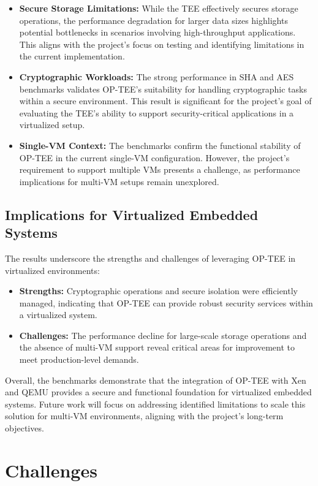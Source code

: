 \documentclass[acmtog]{acmart}
\begin{document}
\begin{itemize}
    \item \textbf{Secure Storage Limitations:} While the TEE effectively secures storage operations, the performance degradation for larger data sizes highlights potential bottlenecks in scenarios involving high-throughput applications. This aligns with the project's focus on testing and identifying limitations in the current implementation.
    \item \textbf{Cryptographic Workloads:} The strong performance in SHA and AES benchmarks validates OP-TEE's suitability for handling cryptographic tasks within a secure environment. This result is significant for the project's goal of evaluating the TEE's ability to support security-critical applications in a virtualized setup.
    \item \textbf{Single-VM Context:} The benchmarks confirm the functional stability of OP-TEE in the current single-VM configuration. However, the project's requirement to support multiple VMs presents a challenge, as performance implications for multi-VM setups remain unexplored.
\end{itemize}

\subsection{Implications for Virtualized Embedded Systems}
The results underscore the strengths and challenges of leveraging OP-TEE in virtualized environments:
\begin{itemize}
    \item \textbf{Strengths:} Cryptographic operations and secure isolation were efficiently managed, indicating that OP-TEE can provide robust security services within a virtualized system.
    \item \textbf{Challenges:} The performance decline for large-scale storage operations and the absence of multi-VM support reveal critical areas for improvement to meet production-level demands.
\end{itemize}

Overall, the benchmarks demonstrate that the integration of OP-TEE with Xen and QEMU provides a secure and functional foundation for virtualized embedded systems. Future work will focus on addressing identified limitations to scale this solution for multi-VM environments, aligning with the project's long-term objectives.


\section{Challenges}
\end{document}
